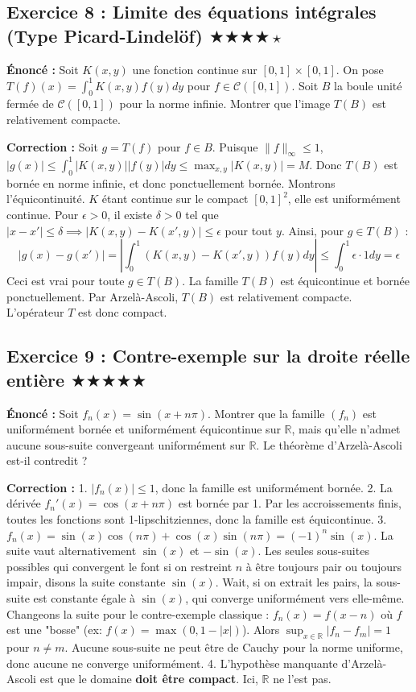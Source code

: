 \documentclass[11pt,a4paper]{article}
\begin{document}
\subsection*{Exercice 8 : Limite des équations intégrales (Type Picard-Lindelöf) \quad $\bigstar\bigstar\bigstar\bigstar\star$}

\textbf{Énoncé :}
Soit $K(x,y)$ une fonction continue sur $[0,1] \times [0,1]$. On pose $T(f)(x) = \int_0^1 K(x,y) f(y) dy$ pour $f \in \mathcal{C}([0,1])$.
Soit $B$ la boule unité fermée de $\mathcal{C}([0,1])$ pour la norme infinie. Montrer que l'image $T(B)$ est relativement compacte.

\textbf{Correction :}
Soit $g = T(f)$ pour $f \in B$. Puisque $\|f\|_\infty \le 1$,
$|g(x)| \le \int_0^1 |K(x,y)| |f(y)| dy \le \max_{x,y} |K(x,y)| = M$.
Donc $T(B)$ est bornée en norme infinie, et donc ponctuellement bornée.
Montrons l'équicontinuité. $K$ étant continue sur le compact $[0,1]^2$, elle est uniformément continue. Pour $\epsilon > 0$, il existe $\delta > 0$ tel que $|x - x'| \le \delta \implies |K(x,y) - K(x',y)| \le \epsilon$ pour tout $y$.
Ainsi, pour $g \in T(B)$ :
$$ |g(x) - g(x')| = \left| \int_0^1 (K(x,y) - K(x',y)) f(y) dy \right| \le \int_0^1 \epsilon \cdot 1 dy = \epsilon $$
Ceci est vrai pour toute $g \in T(B)$. La famille $T(B)$ est équicontinue et bornée ponctuellement. Par Arzelà-Ascoli, $T(B)$ est relativement compacte. L'opérateur $T$ est donc compact.


\subsection*{Exercice 9 : Contre-exemple sur la droite réelle entière \quad $\bigstar\bigstar\bigstar\bigstar\bigstar$}

\textbf{Énoncé :}
Soit $f_n(x) = \sin(x + n\pi)$. Montrer que la famille $(f_n)$ est uniformément bornée et uniformément équicontinue sur $\mathbb{R}$, mais qu'elle n'admet aucune sous-suite convergeant uniformément sur $\mathbb{R}$. Le théorème d'Arzelà-Ascoli est-il contredit ?

\textbf{Correction :}
1. $|f_n(x)| \le 1$, donc la famille est uniformément bornée.
2. La dérivée $f_n'(x) = \cos(x + n\pi)$ est bornée par 1. Par les accroissements finis, toutes les fonctions sont 1-lipschitziennes, donc la famille est équicontinue.
3. $f_n(x) = \sin(x) \cos(n\pi) + \cos(x) \sin(n\pi) = (-1)^n \sin(x)$.
La suite vaut alternativement $\sin(x)$ et $-\sin(x)$. Les seules sous-suites possibles qui convergent le font si on restreint $n$ à être toujours pair ou toujours impair, disons la suite constante $\sin(x)$.
Wait, si on extrait les pairs, la sous-suite est constante égale à $\sin(x)$, qui converge uniformément vers elle-même.
Changeons la suite pour le contre-exemple classique : $f_n(x) = f(x - n)$ où $f$ est une "bosse" (ex: $f(x) = \max(0, 1-|x|)$).
Alors $\sup_{x \in \mathbb{R}} |f_n - f_m| = 1$ pour $n \neq m$. Aucune sous-suite ne peut être de Cauchy pour la norme uniforme, donc aucune ne converge uniformément.
4. L'hypothèse manquante d'Arzelà-Ascoli est que le domaine \textbf{doit être compact}. Ici, $\mathbb{R}$ ne l'est pas.
\end{document}
